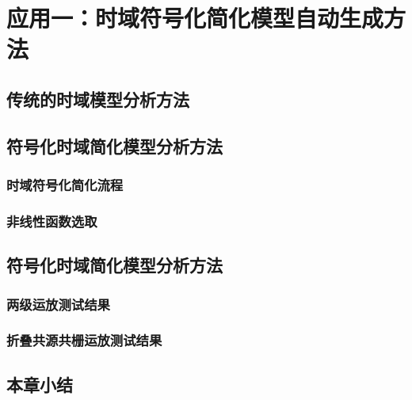 \chapter{应用一：时域符号化简化模型自动生成方法}
\label{chap:time}

\section{传统的时域模型分析方法}
\label{sec:time:origin}

\section{符号化时域简化模型分析方法}
\label{sec:time:simp}

\subsection{时域符号化简化流程}
\label{subsec:time:simp:process}

\subsection{非线性函数选取}
\label{subsec:time:simp:nonlinear}

\section{符号化时域简化模型分析方法}
\label{sec:time:test}

\subsection{两级运放测试结果}
\label{subsec:time:test:ts}

\subsection{折叠共源共栅运放测试结果}
\label{subsec:time:test:fc}

\section{本章小结}
\label{sec:time:con}